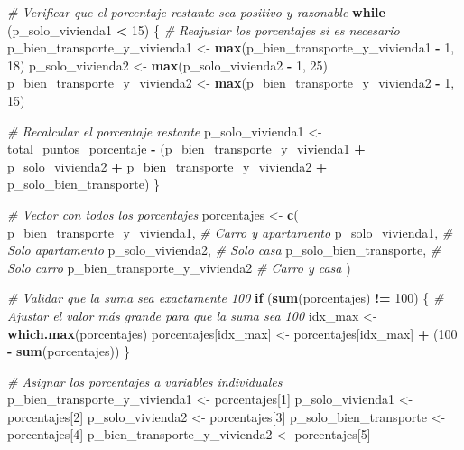 \documentclass[
]{article}
\newenvironment{Shaded}{\begin{snugshade}}{\end{snugshade}}
\newcommand{\CommentTok}[1]{\textcolor[rgb]{0.56,0.35,0.01}{\textit{#1}}}
\newcommand{\ControlFlowTok}[1]{\textcolor[rgb]{0.13,0.29,0.53}{\textbf{#1}}}
\newcommand{\DecValTok}[1]{\textcolor[rgb]{0.00,0.00,0.81}{#1}}
\newcommand{\FunctionTok}[1]{\textcolor[rgb]{0.13,0.29,0.53}{\textbf{#1}}}
\newcommand{\NormalTok}[1]{#1}
\newcommand{\OtherTok}[1]{\textcolor[rgb]{0.56,0.35,0.01}{#1}}
\newcommand{\SpecialCharTok}[1]{\textcolor[rgb]{0.81,0.36,0.00}{\textbf{#1}}}
\begin{document}
\begin{Shaded}
\begin{Highlighting}[]
\CommentTok{\# Verificar que el porcentaje restante sea positivo y razonable}
\ControlFlowTok{while}\NormalTok{ (p\_solo\_vivienda1 }\SpecialCharTok{\textless{}} \DecValTok{15}\NormalTok{) \{}
  \CommentTok{\# Reajustar los porcentajes si es necesario}
\NormalTok{  p\_bien\_transporte\_y\_vivienda1 }\OtherTok{\textless{}{-}} \FunctionTok{max}\NormalTok{(p\_bien\_transporte\_y\_vivienda1 }\SpecialCharTok{{-}} \DecValTok{1}\NormalTok{, }\DecValTok{18}\NormalTok{)}
\NormalTok{  p\_solo\_vivienda2 }\OtherTok{\textless{}{-}} \FunctionTok{max}\NormalTok{(p\_solo\_vivienda2 }\SpecialCharTok{{-}} \DecValTok{1}\NormalTok{, }\DecValTok{25}\NormalTok{)}
\NormalTok{  p\_bien\_transporte\_y\_vivienda2 }\OtherTok{\textless{}{-}} \FunctionTok{max}\NormalTok{(p\_bien\_transporte\_y\_vivienda2 }\SpecialCharTok{{-}} \DecValTok{1}\NormalTok{, }\DecValTok{15}\NormalTok{)}

  \CommentTok{\# Recalcular el porcentaje restante}
\NormalTok{  p\_solo\_vivienda1 }\OtherTok{\textless{}{-}}\NormalTok{ total\_puntos\_porcentaje }\SpecialCharTok{{-}}\NormalTok{ (p\_bien\_transporte\_y\_vivienda1 }\SpecialCharTok{+}\NormalTok{ p\_solo\_vivienda2 }\SpecialCharTok{+}
\NormalTok{                                                p\_bien\_transporte\_y\_vivienda2 }\SpecialCharTok{+}\NormalTok{ p\_solo\_bien\_transporte)}
\NormalTok{\}}

\CommentTok{\# Vector con todos los porcentajes}
\NormalTok{porcentajes }\OtherTok{\textless{}{-}} \FunctionTok{c}\NormalTok{(}
\NormalTok{  p\_bien\_transporte\_y\_vivienda1,  }\CommentTok{\# Carro y apartamento}
\NormalTok{  p\_solo\_vivienda1,              }\CommentTok{\# Solo apartamento}
\NormalTok{  p\_solo\_vivienda2,              }\CommentTok{\# Solo casa}
\NormalTok{  p\_solo\_bien\_transporte,        }\CommentTok{\# Solo carro}
\NormalTok{  p\_bien\_transporte\_y\_vivienda2  }\CommentTok{\# Carro y casa}
\NormalTok{)}

\CommentTok{\# Validar que la suma sea exactamente 100}
\ControlFlowTok{if}\NormalTok{ (}\FunctionTok{sum}\NormalTok{(porcentajes) }\SpecialCharTok{!=} \DecValTok{100}\NormalTok{) \{}
  \CommentTok{\# Ajustar el valor más grande para que la suma sea 100}
\NormalTok{  idx\_max }\OtherTok{\textless{}{-}} \FunctionTok{which.max}\NormalTok{(porcentajes)}
\NormalTok{  porcentajes[idx\_max] }\OtherTok{\textless{}{-}}\NormalTok{ porcentajes[idx\_max] }\SpecialCharTok{+}\NormalTok{ (}\DecValTok{100} \SpecialCharTok{{-}} \FunctionTok{sum}\NormalTok{(porcentajes))}
\NormalTok{\}}

\CommentTok{\# Asignar los porcentajes a variables individuales}
\NormalTok{p\_bien\_transporte\_y\_vivienda1 }\OtherTok{\textless{}{-}}\NormalTok{ porcentajes[}\DecValTok{1}\NormalTok{]}
\NormalTok{p\_solo\_vivienda1 }\OtherTok{\textless{}{-}}\NormalTok{ porcentajes[}\DecValTok{2}\NormalTok{]}
\NormalTok{p\_solo\_vivienda2 }\OtherTok{\textless{}{-}}\NormalTok{ porcentajes[}\DecValTok{3}\NormalTok{]}
\NormalTok{p\_solo\_bien\_transporte }\OtherTok{\textless{}{-}}\NormalTok{ porcentajes[}\DecValTok{4}\NormalTok{]}
\NormalTok{p\_bien\_transporte\_y\_vivienda2 }\OtherTok{\textless{}{-}}\NormalTok{ porcentajes[}\DecValTok{5}\NormalTok{]}


\end{Highlighting}
\end{Shaded}
\end{document}
